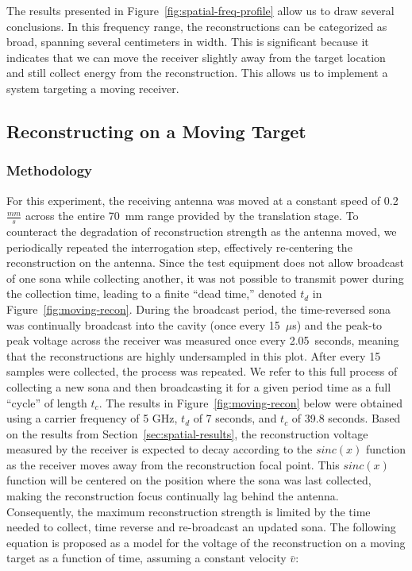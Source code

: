 The results presented in Figure~\ref{fig:spatial-freq-profile} allow us to draw several conclusions. In this frequency range, the reconstructions can be categorized as broad, spanning several centimeters in width. This is significant because it indicates that we can move the receiver slightly away from the target location and still collect energy from the reconstruction. This allows us to implement a system targeting a moving receiver.

\subsection{Reconstructing on a Moving Target}
\label{sec:recon-moving}

\subsubsection{Methodology}
For this experiment, the receiving antenna was moved at a constant speed of 0.2~$\frac{mm}{s}$ across the entire 70~mm range provided by the translation stage. To counteract the degradation of reconstruction strength as the antenna moved, we periodically repeated the interrogation step, effectively re-centering the reconstruction on the antenna. Since the test equipment does not allow broadcast of one sona while collecting another, it was not possible to transmit power during the collection time, leading to a finite ``dead time,'' denoted $t_d$ in Figure~\ref{fig:moving-recon}. During the broadcast period, the time-reversed sona was continually broadcast into the cavity (once every 15~$\mu$s) and the peak-to peak voltage across the receiver was measured once every 2.05~seconds, meaning that the reconstructions are highly undersampled in this plot. After every 15 samples were collected, the process was repeated. We refer to this full process of collecting a new sona and then broadcasting it for a given period time as a full ``cycle'' of length $t_c$. The results in Figure~\ref{fig:moving-recon}  below were obtained using a carrier frequency of 5 GHz, $t_d$ of 7 seconds, and $t_c$ of 39.8 seconds. Based on the results from Section~\ref{sec:spatial-results}, the \ptp{} reconstruction voltage measured by the receiver is expected to decay according to the $sinc(x)$ function as the receiver moves away from the reconstruction focal point. This $sinc(x)$ function will be centered on the position where the sona was last collected, making the reconstruction focus continually lag behind the antenna. Consequently, the maximum reconstruction strength is limited by the time needed to collect, time reverse and re-broadcast an updated sona. The following equation is proposed as a model for the \ptp{} voltage of the reconstruction on a moving target as a function of time, assuming a constant velocity $\bar{v}$:

